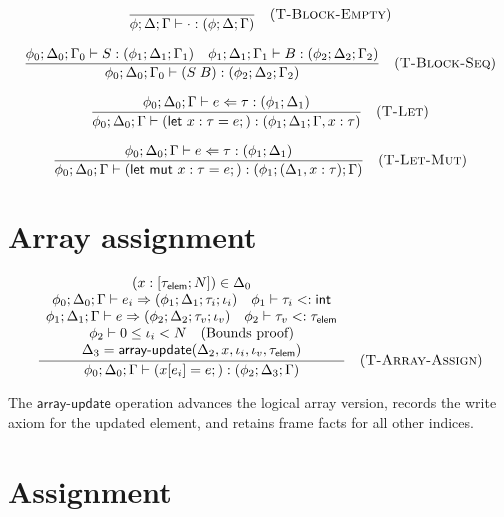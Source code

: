 $$
  \frac{}{\phi; \Delta; \Gamma \vdash \cdot : (\phi; \Delta; \Gamma)} \quad (\textsc{T-Block-Empty})
$$

$$
  \frac{
    \phi_0; \Delta_0; \Gamma_0 \vdash S : (\phi_1; \Delta_1; \Gamma_1) \quad \phi_1; \Delta_1; \Gamma_1 \vdash B : (\phi_2; \Delta_2; \Gamma_2)
  }{
    \phi_0; \Delta_0; \Gamma_0 \vdash (S\; B) : (\phi_2; \Delta_2; \Gamma_2)
  } \quad (\textsc{T-Block-Seq})
$$

$$\frac{\phi_0; \Delta_0; \Gamma \vdash e \Leftarrow \tau : (\phi_1; \Delta_1)}{\phi_0; \Delta_0; \Gamma \vdash (\textsf{let } x:\tau = e;) : (\phi_1; \Delta_1; \Gamma, x:\tau)} \quad (\textsc{T-Let})$$

$$\frac{\phi_0; \Delta_0; \Gamma \vdash e \Leftarrow \tau : (\phi_1; \Delta_1)}{\phi_0; \Delta_0; \Gamma \vdash (\textsf{let mut } x:\tau = e;) : (\phi_1; (\Delta_1, x:\tau); \Gamma)} \quad (\textsc{T-Let-Mut})$$

\section*{Array assignment}

$$
  \frac{
    \begin{array}{c}
      (x: [\tau_\textsf{elem}; N]) \in \Delta_0                                                                                 \\
      \phi_0; \Delta_0; \Gamma \vdash e_i \Rightarrow (\phi_1; \Delta_1; \tau_i; \iota_i) \quad \phi_1 \vdash \tau_i <: \textsf{int} \\
      \phi_1; \Delta_1; \Gamma \vdash e \Rightarrow (\phi_2; \Delta_2; \tau_v; \iota_v) \quad \phi_2 \vdash \tau_v <: \tau_\textsf{elem} \\
      \phi_2 \vdash 0 \le \iota_i < N \quad \text{(Bounds proof)} \\
      \Delta_3 = \textsf{array-update}(\Delta_2, x, \iota_i, \iota_v, \tau_\textsf{elem})
    \end{array}
  }{
    \phi_0; \Delta_0; \Gamma \vdash (x[e_i] = e;) : (\phi_2; \Delta_3; \Gamma)
  } \quad (\textsc{T-Array-Assign})
$$

\noindent The $\textsf{array-update}$ operation advances the logical array version, records the write axiom for the updated element, and retains frame facts for all other indices.

\section*{Assignment}

